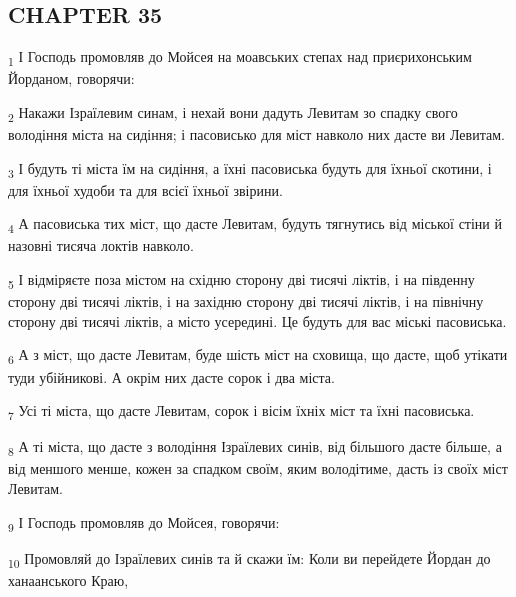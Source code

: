 \subsection{CHAPTER 35}
\begin{tcolorbox}
\textsubscript{1} І Господь промовляв до Мойсея на моавських степах над приєрихонським Йорданом, говорячи:
\end{tcolorbox}
\begin{tcolorbox}
\textsubscript{2} Накажи Ізраїлевим синам, і нехай вони дадуть Левитам зо спадку свого володіння міста на сидіння; і пасовисько для міст навколо них дасте ви Левитам.
\end{tcolorbox}
\begin{tcolorbox}
\textsubscript{3} І будуть ті міста їм на сидіння, а їхні пасовиська будуть для їхньої скотини, і для їхньої худоби та для всієї їхньої звірини.
\end{tcolorbox}
\begin{tcolorbox}
\textsubscript{4} А пасовиська тих міст, що дасте Левитам, будуть тягнутись від міської стіни й назовні тисяча локтів навколо.
\end{tcolorbox}
\begin{tcolorbox}
\textsubscript{5} І відміряєте поза містом на східню сторону дві тисячі ліктів, і на південну сторону дві тисячі ліктів, і на західню сторону дві тисячі ліктів, і на північну сторону дві тисячі ліктів, а місто усередині. Це будуть для вас міські пасовиська.
\end{tcolorbox}
\begin{tcolorbox}
\textsubscript{6} А з міст, що дасте Левитам, буде шість міст на сховища, що дасте, щоб утікати туди убійникові. А окрім них дасте сорок і два міста.
\end{tcolorbox}
\begin{tcolorbox}
\textsubscript{7} Усі ті міста, що дасте Левитам, сорок і вісім їхніх міст та їхні пасовиська.
\end{tcolorbox}
\begin{tcolorbox}
\textsubscript{8} А ті міста, що дасте з володіння Ізраїлевих синів, від більшого дасте більше, а від меншого менше, кожен за спадком своїм, яким володітиме, дасть із своїх міст Левитам.
\end{tcolorbox}
\begin{tcolorbox}
\textsubscript{9} І Господь промовляв до Мойсея, говорячи:
\end{tcolorbox}
\begin{tcolorbox}
\textsubscript{10} Промовляй до Ізраїлевих синів та й скажи їм: Коли ви перейдете Йордан до ханаанського Краю,
\end{tcolorbox}
